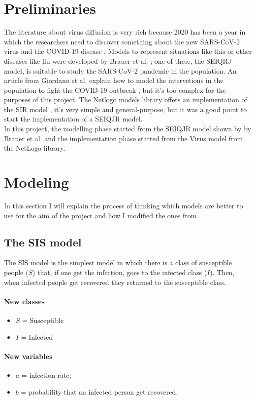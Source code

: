 \documentclass[12pt]{llncs}
\begin{document}
\section{Preliminaries}
The literature about virus diffusion is very rich because 2020 has been a year in which the researchers need to discover something about the new SARS-CoV-2 virus and the COVID-19 disease \cite{singhal}. Models to represent situations like this or other diseases like flu were developed by Brauer et al. \cite{brauer}; one of these, the SEIQRJ model, is suitable to study the SARS-CoV-2 pandemic in the population. An article from Giordano et al. explain how to model the intervetions in the population to fight the COVID-19 outbreak \cite{giordano}, but it's too complex for the purposes of this project. The Netlogo \cite{netlogo} models library offers an implementation of the SIR model \cite{netlogo-virus}, it's very simple and general-purpose, but it was a good point to start the implementation of a SEIQJR model.\\ 
In this project, the modelling phase started from the SEIQJR model shown by by Brauer et al. and the implementation phase started from the Virus model from the NetLogo library.

\section{Modeling}
In this section I will explain the process of thinking which models are better to use for the aim of the project and how I modified the ones from \cite{brauer}.

\subsection{The SIS model}
The SIS model is the simplest model in which there is a class of susceptible people ($S$) that, if one get the infection, goes to the infected class ($I$). Then, when infected people get recovered they returned to the susceptible class.

\paragraph{New classes}
\begin{itemize}
\item $S$ = Susceptible
\item $I$ = Infected
\end{itemize}

\paragraph{New variables}
\begin{itemize}
\item $a$ = infection rate;
\item $b$ = probability that an infected person get recovered.
\end{itemize}
\end{document}
